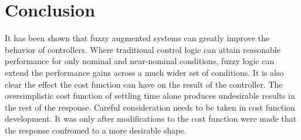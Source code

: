 \section{Conclusion} It has been shown that fuzzy augmented systems can greatly improve the behavior of
controllers. Where traditional control logic can attain reasonable performance for only nominal and
near-nominal conditions, fuzzy logic can extend the performance gains across a much wider set of conditions.
It is also clear the effect the cost function can have on the result of the controller. The oversimplistic
cost function of settling time alone produces undesirable results in the rest of the response. Careful
consideration needs to be taken in cost function development. It was only after modifications to the cost
function were made that the response confromed to a more desirable shape.

